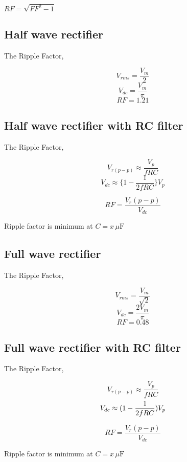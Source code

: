 \begin{center}
    \(RF = \sqrt{FF^2 - 1}\)
\end{center}

\subsection{Half wave rectifier}

    The Ripple Factor, 
    
    \[V_{rms} = \frac{V_m}{2}\]
    \[V_{dc} = \frac{V_m}{\pi}\]
    \[RF = 1.21\]

\subsection{Half wave rectifier with RC filter}
    The Ripple Factor,

            \[V_{r(p-p)} \approx \frac{V_p}{fRC} \]
            \[V_{dc} \approx \{ 1- \frac{1}{2fRC}\} V_p\]

            \[RF = \frac{V_r(p-p)}{V_{dc}}\]

    Ripple factor is minimum at \( C = x \, \mu\text{F} \)

    
\subsection{Full wave rectifier}

    The Ripple Factor, 
    
    \[V_{rms} = \frac{V_m}{\sqrt{2}}\]
    \[V_{dc} = \frac{2V_m}{\pi}\]
    \[RF = 0.48\]

\subsection{Full wave rectifier with RC filter}
    The Ripple Factor,

            \[V_{r(p-p)} \approx \frac{V_p}{fRC} \]
            \[V_{dc} \approx \\( 1- \frac{1}{2fRC}\\) V_p\]

            \[RF = \frac{V_r(p-p)}{V_{dc}}\]

    Ripple factor is minimum at \( C = x \, \mu\text{F} \)